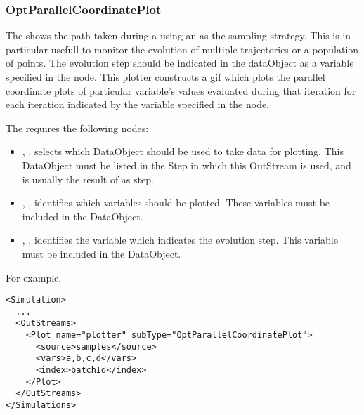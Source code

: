 \subsubsection{OptParallelCoordinatePlot}
The   shows the path taken during a  using
an  as the sampling strategy. This is in particular usefull to monitor the evolution of multiple
trajectories or a population of points.
The evolution step should be indicated in the dataObject as a variable specified in the  node.
This plotter constructs a gif which plots the parallel coordinate plots of particular variable's values evaluated
during that iteration for each iteration indicated by the variable specified in the  node.

The   requires the following nodes:
\begin{itemize}
  \item {}, , selects which DataObject should be used
      to take data for plotting. This DataObject must be listed in the Step in which this
      OutStream is used, and is usually the result of as  step.
  \item {}, , identifies which variables should
      be plotted. These variables must be included in the 
      DataObject.
  \item {}, , identifies the variable which indicates
      the evolution step. This variable must be included in the  DataObject.
\end{itemize}

For example,
\begin{lstlisting}[style=XML]
<Simulation>
  ...
  <OutStreams>
    <Plot name="plotter" subType="OptParallelCoordinatePlot">
      <source>samples</source>
      <vars>a,b,c,d</vars>
      <index>batchId</index>
    </Plot>
  </OutStreams>
</Simulations>
\end{lstlisting}
